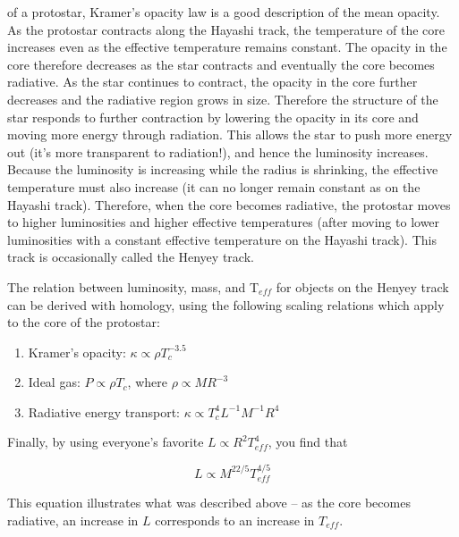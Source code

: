 of a protostar, Kramer's opacity law is a good description of the mean opacity.
As the protostar contracts along the Hayashi track, the temperature of the core increases
even as the effective temperature remains constant.  The opacity in the core therefore decreases
as the star contracts and eventually the core becomes radiative.  As the star continues to
contract, the opacity in the core further decreases and the radiative region grows in size.
Therefore the structure of the star responds to further contraction by lowering the opacity
in its core and moving more energy through radiation.  This allows the star to push more energy
out (it's more transparent to radiation!), and hence the luminosity increases.  Because the
luminosity is increasing while the radius is shrinking, the effective temperature must also
increase (it can no longer remain constant as on the Hayashi track).  Therefore, when the core becomes radiative, the protostar moves to higher luminosities and
higher effective temperatures (after moving to lower luminosities with a constant effective
temperature on the Hayashi track).  This track is occasionally called the Henyey track.

\indent The relation between luminosity, mass, and T$_{eff}$ for objects on the Henyey track can be derived with homology, using the following scaling relations which apply to the core of the protostar:

\begin{enumerate}
	\item Kramer's opacity: $\kappa \propto \rho T_{c}^{-3.5}$
	\item Ideal gas: $P \propto \rho T_{c}$, where $\rho \propto M R^{-3}$
	\item Radiative energy transport: $\kappa \propto T_{c}^{4} L^{-1} M^{-1} R^{4}$
\end{enumerate}

\noindent Finally, by using everyone's favorite $L \propto R^{2} T_{eff}^{4}$, you find that

\begin{equation}
L \propto M^{22/5} T_{eff}^{4/5}
\end{equation}

This equation illustrates what was described above -- as the core becomes radiative, an increase in $L$ corresponds to an increase in $T_{eff}$.

